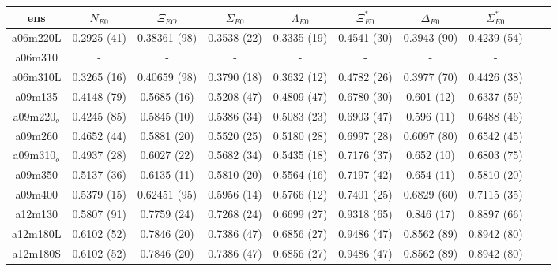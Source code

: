 \documentclass{article}
\begin{document}
 \begin{table}[h!]
  \centering
 \setlength{\arrayrulewidth}{0.5mm}
\setlength{\tabcolsep}{13pt}
\renewcommand{\arraystretch}{2}
 \begin{tabular}{|| c |c | c | c | c | c | c | c | c | c | ||} 
 \hline
 ens & $N_{E0}$ & $\Xi_{EO}$ & $\Sigma_{E0}$ & $\Lambda_{E0}$ &  $\Xi^*_{E0}$ & $\Delta_{E0}$ & $\Sigma^*_{E0}$\\ [0.8ex] 
 \hline\hline
 a06m220L 
 & {0.2925 (41)}   &   { 0.38361 (98)} & {0.3538 (22)}   & { 0.3335 (19)}   & {0.4541 (30)}  & { 0.3943 (90)} & {0.4239 (54)} \\ 
 \hline
 a06m310 
 & {-}   &   {-} & {-}   & {-}   & {-}  & {-} & {-} \\ 
 \hline
 a06m310L 
  & {0.3265 (16)}   &   {0.40659 (98)} & {0.3790 (18)}   & {0.3632 (12)}   & {0.4782 (26)}  & {0.3977 (70)} & {0.4426 (38)} \\ 
 \hline
 a09m135 
  & {0.4148 (79)}   &   {0.5685 (16)} & {0.5208 (47)}   & {0.4809 (47)}   & {0.6780 (30)}  & { 0.601 (12)} & {0.6337 (59)} \\ 
 \hline
 a09m220$_o$ 
 & {0.4245 (85)}   &   {0.5845 (10)} & {0.5386 (34)}   & {0.5083 (23)}   & {0.6903 (47)}  & {0.596 (11)} & {0.6488 (46)} \\ 
 \hline
 a09m260
  & {0.4652 (44)}   &   {0.5881 (20)} & {0.5520 (25)}   & {0.5180 (28)}   & {0.6997 (28)}  & { 0.6097 (80)} & { 0.6542 (45)} \\ 
 \hline
 a09m310$_o$
  & { 0.4937 (28)}   &   {0.6027 (22)} & { 0.5682 (34)}   & {0.5435 (18)}   & {0.7176 (37)}  & {0.652 (10)} & {0.6803 (75)} \\ 
 \hline
 a09m350 
  & {0.5137 (36)}   &   {0.6135 (11)} & {0.5810 (20)}   & {0.5564 (16)}   & {0.7197 (42)}  & {0.654 (11)} & {0.5810 (20)} \\ 
 \hline
 a09m400 
  & { 0.5379 (15)}   &   {0.62451 (95)} & { 0.5956 (14)}   & { 0.5766 (12)}   & {0.7401 (25)}  & { 0.6829 (60)} & { 0.7115 (35)} \\ 
 \hline
 a12m130 
  & {0.5807 (91)}   &   {0.7759 (24)} & { 0.7268 (24)}   & {0.6699 (27)}   & { 0.9318 (65)}  & {0.846 (17)} & {0.8897 (66)} \\ 
 \hline
  a12m180L 
  & {0.6102 (52)}   &   {0.7846 (20)} & {0.7386 (47)}   & {0.6856 (27)}   & {0.9486 (47)}  & { 0.8562 (89)} & {0.8942 (80)} \\ 
 \hline
  a12m180S 
  & {0.6102 (52)}   &   {0.7846 (20)} & {0.7386 (47)}   & {0.6856 (27)}   & {0.9486 (47)}  & {0.8562 (89)} & {0.8942 (80)} \\ 

\end{tabular}
\end{table}
\end{document}
